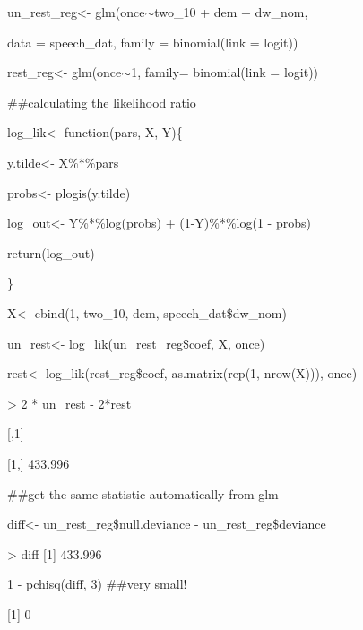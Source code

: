 \documentclass{beamer}
\begin{document}
\begin{frame}

\small
\begin{semiverbatim}

un\_rest\_reg<- glm(once$\sim$two\_10 + dem + dw\_nom,

\hspace{0.15in} data = speech\_dat, family = binomial(link = logit))


rest\_reg<- glm(once$\sim$1, family= binomial(link = logit))


\#\#calculating the likelihood ratio

log\_lik<- function(pars, X, Y)\{

  \hspace{0.15in} y.tilde<- X\%*\%pars

  \hspace{0.15in} probs<- plogis(y.tilde)

  \hspace{0.15in} log\_out<- Y\%*\%log(probs) + (1-Y)\%*\%log(1 - probs)

  \hspace{0.15in} return(log\_out)

  \}

 X<- cbind(1, two\_10, dem, speech\_dat\$dw\_nom)


 un\_rest<- log\_lik(un\_rest\_reg\$coef, X, once)


 rest<- log\_lik(rest\_reg\$coef, as.matrix(rep(1, nrow(X))), once)


 > 2 * un\_rest - 2*rest

\hspace{0.15in}        [,1]

[1,] 433.996








 \#\#get the same statistic automatically from glm

 diff<- un\_rest\_reg\$null.deviance - un\_rest\_reg\$deviance

 > diff
[1] 433.996

 1 - pchisq(diff, 3) \#\#very small!

[1] 0

\end{semiverbatim}



\end{frame}
\end{document}
